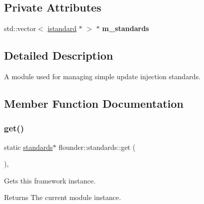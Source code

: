 \subsection*{Private Attributes}
\begin{DoxyCompactItemize}
\item 
\mbox{\label{classflounder_1_1standards_a022e3fe7bc232e076b6b2fe260f7cbde}} 
std\+::vector$<$ \hyperlink{classflounder_1_1istandard}{istandard} $\ast$ $>$ $\ast$ {\bfseries m\+\_\+standards}
\end{DoxyCompactItemize}


\subsection{Detailed Description}
A module used for managing simple update injection standards. 



\subsection{Member Function Documentation}
\mbox{\label{classflounder_1_1standards_af31cbc5c0616e052b210cc821ebdd8d5}} 
\subsubsection{\texorpdfstring{get()}{get()}}
{\footnotesize\ttfamily static \hyperlink{classflounder_1_1standards}{standards}$\ast$ flounder\+::standards\+::get (\begin{DoxyParamCaption}{ }\end{DoxyParamCaption})\hspace{0.3cm}{\ttfamily [inline]}, {\ttfamily [static]}}



Gets this framework instance. 

\begin{DoxyReturn}{Returns}
The current module instance. 
\end{DoxyReturn}
\mbox{\label{classflounder_1_1standards_a681e682db67c10abb814cf0f8daf086a}} 
